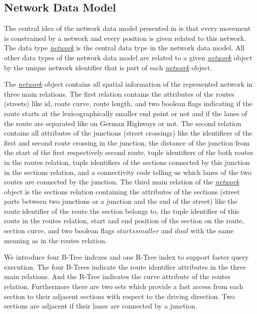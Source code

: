 \documentclass[a4paper]{article}
\newcommand{\dt}[1]{\textsl{\underline{#1}}}
\begin{document}
\subsection{Network Data Model}
\label{sec:netdatamod}
The central idea of the network data model presented in \cite{1146465} is that
every movement is constrained by a network and every position is given related
to this network. The data type \dt{network} is the central data type in the network
data model. All other data types of the network data model are related to a
given \dt{network} object by the unique network identifier that is part of
each \dt{network} object.

The \dt{network} object contains all spatial information of the represented network
in three main relations. The first relation contains the attributes of the routes
(streets) like id, route curve, route length, and two boolean flags indicating
if the route starts at the lexicographically smaller end point or not and if the
lanes of the route are separated like on German Highways or not.
The second relation
contains all attributes of the junctions (street crossings) like the identifiers
of the first and second route crossing in the junction, the distance of the
junction from the start of the first respectively second route, tuple identifiers
of the both routes in the routes relation, tuple identifiers of the sections
connected by this junction in the sections relation, and a connectivity code
telling us which lanes of the two routes are connected by the junction. The third
main relation of the \dt{network} object is the sections relation containing the
attributes of the sections (street parts between two junctions or a junction and
the end of the street) like the route identifier of the route the section belongs to,
the tuple identifier of this route in the routes relation, start and end position
of the section on the route, section curve, and two boolean flags $startssmaller$
and $dual$ with the same meaning as in the routes relation.

We introduce four B-Tree indexes and one R-Tree index to support faster query execution.
The four B-Trees indicate the route identifier attributes in the three main relations.
And the R-Tree indicates the curve attribute of the routes relation. Furthermore
there are two sets which provide a fast access from each section to their adjacent
sections with respect to the driving direction. Two sections are adjacent if their
lanes are connected by a junction.
\end{document}
